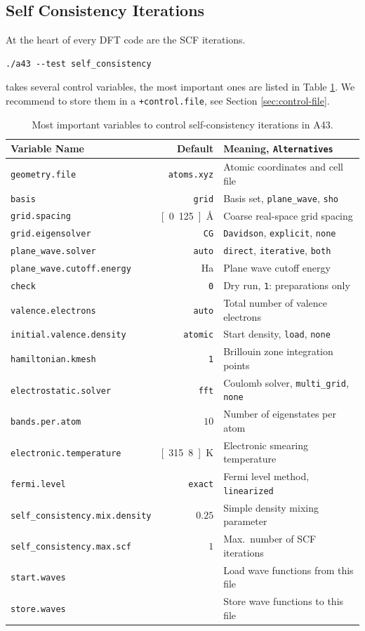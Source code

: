 \documentclass[oribibl]{llncs}
\newcommand{\ttt}[1]{\texttt{#1}}
\newcommand{\codename}{A43}
\begin{document}
\subsection{Self Consistency Iterations} \label{sec:self-consistency}
%
At the heart of every \ac{DFT} code are the \ac{SCF} iterations.
\begin{verbatim}
./a43 --test self_consistency
\end{verbatim}
takes several control variables, the most important ones are listed in Table \ref{tab:main-scf-variables}.
We recommend to store them in a \ttt{+control.file}, see Section \ref{sec:control-file}.
%
\begin{table}[h]
\caption[Main Variables]{
Most important variables to control self-consistency iterations in \codename{}.
} \label{tab:main-scf-variables}
\centering
\begin{tabular}{|l|r|l|}
\hline
  Variable Name & Default & Meaning, \ttt{Alternatives} \\
\hline
  \ttt{geometry.file} & \ttt{atoms.xyz}   & Atomic coordinates and cell file \\
  \ttt{basis}         & \ttt{grid}        & Basis set, \ttt{plane\_wave}, \ttt{sho} \\ 
  \ttt{grid.spacing}  & \unit[0.125]{\AA} & Coarse real-space grid spacing \\
  \ttt{grid.eigensolver} & \ttt{CG}       & \ttt{Davidson}, \ttt{explicit}, \ttt{none} \\
  \ttt{plane\_wave.solver} & \ttt{auto}   & \ttt{direct}, \ttt{iterative}, \ttt{both} \\ 
  \ttt{plane\_wave.cutoff.energy} & \unit[11]{Ha} & Plane wave cutoff energy \\
  \ttt{check}         & \ttt{0}           & Dry run, \ttt{1}: preparations only \\
  \ttt{valence.electrons} & \ttt{auto}    & Total number of valence electrons \\
  \ttt{initial.valence.density} & \ttt{atomic} & Start density, \ttt{load}, \ttt{none} \\
  \ttt{hamiltonian.kmesh} & \ttt{1}       & Brillouin zone integration points \\
  \ttt{electrostatic.solver} & \ttt{fft}  & Coulomb solver, \ttt{multi\_grid}, \ttt{none} \\
  \ttt{bands.per.atom} & $10$ 			  & Number of eigenstates per atom \\
  \ttt{electronic.temperature} & \unit[315.8]{K} & Electronic smearing temperature \\
  \ttt{fermi.level}   & \ttt{exact}       & Fermi level method, \ttt{linearized} \\
  \ttt{self\_consistency.mix.density} & $0.25$ & Simple density mixing parameter \\
  \ttt{self\_consistency.max.scf} & $1$   & Max.~number of \ac{SCF} iterations \\
  \ttt{start.waves}   &                   & Load wave functions from this file \\
  \ttt{store.waves}   &                   & Store wave functions to this file \\
\hline
\end{tabular}
\end{table}
\end{document}

